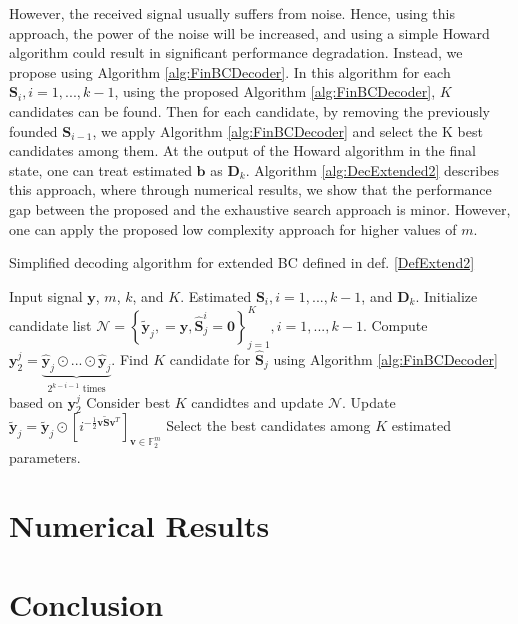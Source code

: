 \documentclass[lettersize,journal,onecolumn]{IEEEtran}
\begin{document}
However, the received signal usually suffers from noise. Hence, using this approach, the power of the noise will be increased, and using a simple Howard algorithm could result in significant performance degradation. Instead, we propose using Algorithm \ref{alg:FinBCDecoder}. In this algorithm for each $\mathbf{S}_i, i=1,...,k-1$, using the proposed Algorithm \ref{alg:FinBCDecoder}, $K$ candidates can be found. Then for each candidate, by removing the previously founded $\mathbf{S}_{i-1}$, we apply Algorithm \ref{alg:FinBCDecoder} and select the K best candidates among them. At the output of the Howard algorithm in the final state, one can treat estimated $\mathbf{b}$ as $\mathbf{D}_k$. Algorithm \ref{alg:DecExtended2} describes this approach, where through numerical results, we show that the performance gap between the proposed and the exhaustive search approach is minor. However, one can apply the proposed low complexity approach for higher values of $m$.
 \begin{algorithm}[!h]
	\caption{Simplified decoding algorithm for extended BC defined in def. \ref{DefExtend2}\label{alg:DecExtended2}}
	\begin{algorithmic}[1]
		\Require Input signal $\mathbf{y}$, $m$, $k$, and $K$.
		\Ensure Estimated $\mathbf{S}_i, i=1,...,k-1$, and $\mathbf{D}_k$.
		\State Initialize candidate list $\mathcal{N} = \left\{ \widetilde{\mathbf{y}}_j, = \mathbf{y}, \widehat{\mathbf{S}}^i_j=\mathbf{0} \right\}_{j=1}^K, i=1,...,k-1$.
		\State Compute $\mathbf{y}_2^j = \underbrace{\widehat{\mathbf{y}}_j\odot...\odot \widehat{\mathbf{y}}_j}_{2^{k-i-1} \text{ times}}$.
		\State Find $K$ candidate for $\widehat{\mathbf{S}}_j$ using Algorithm \ref{alg:FinBCDecoder} based on $\mathbf{y}_2^j$
		\EndFor
		\State Consider best $K$ candidtes and update $\mathcal{N}$.
		\State Update $\widetilde{\mathbf{y}}_j = \widetilde{\mathbf{y}}_j \odot \left[ i^{-\frac{1}{2}\mathbf{v}\widetilde{\mathbf{S}} \mathbf{v}^T } \right]_{\mathbf{v} \in \mathbb{F}_2^m}$
		\EndFor
		\State Select the best candidates among $K$ estimated parameters.
	\end{algorithmic}
\end{algorithm}
\section{Numerical Results}

\section{Conclusion}
\end{document}

